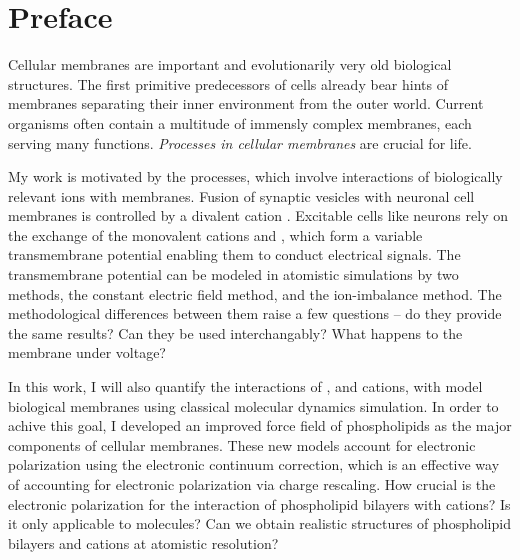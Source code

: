 \chapter*{Preface}

Cellular membranes are important and evolutionarily very old biological structures. 
\citep{MolBiolCell} 
The first primitive predecessors of cells already bear hints of membranes 
separating their inner environment from the outer world. 
Current organisms often contain a multitude of immensly complex membranes, 
each serving many functions. 
\emph{Processes in cellular membranes} are crucial for life. 

My work is motivated by the processes,
which involve interactions of biologically relevant ions with membranes. 
Fusion of synaptic vesicles with neuronal cell membranes 
is controlled by a divalent cation .
Excitable cells like neurons 
rely on the exchange of the monovalent cations  and ,
which form a variable transmembrane potential
enabling them to conduct electrical signals. 
The transmembrane potential can be modeled in atomistic simulations by two methods, 
the constant electric field method, 
and the ion-imbalance method. 
The methodological differences between them raise a few questions -- 
do they provide the same results? 
Can they be used interchangably?
What happens to the membrane under voltage?


In this work, 
I will also quantify the interactions of 
,  and  cations,
with model biological membranes
using classical molecular dynamics simulation. 
In order to achive this goal,
I developed an improved force field
of phospholipids as the major components of cellular membranes.
These new models account for electronic polarization
using the electronic continuum correction,  
which is an effective way of accounting for electronic polarization via charge rescaling. 
How crucial is the electronic polarization for the interaction of phospholipid bilayers with cations?
Is it only applicable to molecules?
Can we obtain realistic structures of phospholipid bilayers and cations at atomistic resolution?



